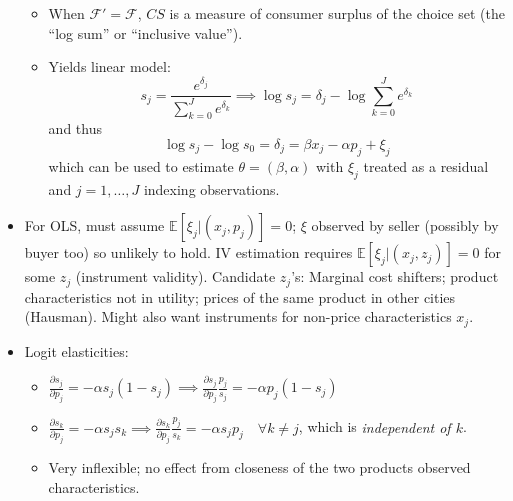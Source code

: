 \documentclass[11pt]{article}
\numberwithin{equation}{section}
\begin{document}
\begin{itemize}
\begin{itemize}
\begin{equation}
		\end{equation}
		\item When $\mathscr{F}'=\mathscr{F}$, $CS$ is a measure of consumer surplus of the choice set (the ``log sum'' or ``inclusive value'').
		\item Yields linear model:
		\begin{equation}
			s_j = \frac{e^{\delta_j}}{\sum_{k=0}^{J}e^{\delta_k}} \implies \log{s_j} = \delta_j - \log{\sum_{k=0}^{J}e^{\delta_k}}
		\end{equation}
		and thus
		\begin{equation}
			\log{s_j} - \log{s_0} = \delta_j = \beta{}x_j -\alpha{}p_j + \xi_j
		\end{equation}
		which can be used to estimate $\theta = (\beta, \alpha)$ with $\xi_j$ treated as a residual and $j=1,\dots,J$ indexing observations.
	\end{itemize}
	\item For OLS, must assume $\mathbb{E}[\xi_j|(x_j,p_j)]=0$; $\xi$ observed by seller (possibly by buyer too) so unlikely to hold.
  IV estimation requires $\mathbb{E}[\xi_j|(x_j,z_j)]=0$ for some $z_j$ (instrument validity).
  Candidate $z_j$'s: Marginal cost shifters; product characteristics not in utility; prices of the same product in other cities (Hausman).
  Might also want instruments for non-price characteristics $x_j$.
	\item Logit elasticities:
	\begin{itemize}
		\item $\frac{\partial s_j}{\partial p_j} = -\alpha s_j(1-s_j) \implies \frac{\partial s_j}{\partial p_j}\frac{p_j}{s_j} =  -\alpha p_j(1-s_j)$
		\item $\frac{\partial s_k}{\partial p_j} = -\alpha s_js_k \implies \frac{\partial s_k}{\partial p_j}\frac{p_j}{s_k} = -\alpha s_j p_j \quad \forall k\neq j$, which is \emph{independent of $k$}.
		\item Very inflexible; no effect from closeness of the two products observed characteristics.
	\end{itemize}
\end{itemize}
\end{document}

